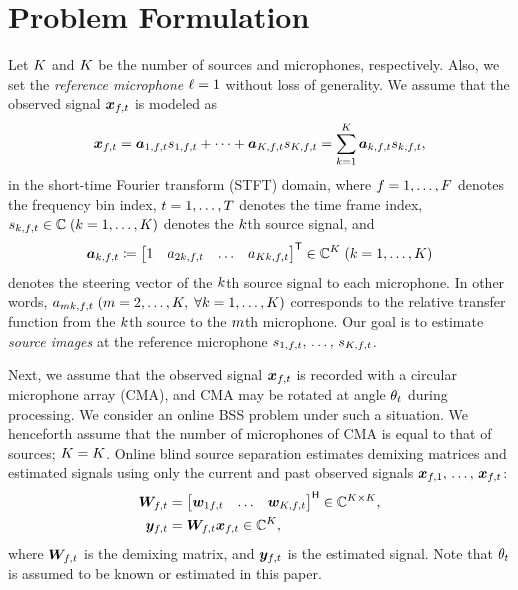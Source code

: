 \documentclass[sip,biber]{now-journal}
\begin{document}
\section{Problem Formulation}\label{sec:problem}
Let $K$ and $\Mic$ be the number of sources and microphones, respectively.
Also, we set the \emph{reference microphone} $\ell = 1$ without loss of generality.
We assume that the observed signal $\Obs _{\ft}$ is modeled as
\begin{equation}
  \Obs _{\ft} = \steer _{1,\ft} \sig _{1,\ft} + \dots + \steer _{\Src,\ft} \sig _{\Src,\ft} = \sum _{\src=1} ^{\Src} \steer _{\src,\ft} \sig _{\src,\ft},\label{eq:mix}
\end{equation}
in the short-time Fourier transform (STFT) domain,
where $f = 1, \dots, F$ denotes the frequency bin index,
$t = 1, \dots, T$ denotes the time frame index,
$\sig _{\src,\ft} \in \C\; (\src = 1, \dots, \Src)$ denotes the $k$th source signal, and
\begin{equation*}
  \steer _{\src,\ft} \coloneqq \begin{bmatrix} 1 & \str _{2\src,\ft} & \dots & \str _{\Mic\src,\ft} \end{bmatrix} ^{\top} \in \C ^{\Mic}\; (\src = 1, \dots, \Src)
\end{equation*}
denotes the steering vector of the $k$th source signal to each microphone.
In other words, $\str _{\mic\src,\ft} \; (\mic = 2, \dots, \Mic,\; \forall \src = 1, \dots, \Src)$ corresponds to the relative transfer function from the $k$th source to the $m$th microphone.
Our goal is to estimate \emph{source images} at the reference microphone $\sig _{1,\ft},\, \dots,\, \sig _{\Src,\ft}$.

Next, we assume that the observed signal $\Obs _{\ft}$ is recorded with a circular microphone array (CMA), and CMA may be rotated at angle $\theta _{t}$ during processing.
We consider an online BSS problem under such a situation.
We henceforth assume that the number of microphones of CMA is equal to that of sources; $\Mic = \Src$.
\renewcommand{\Mic}{\Src}%
Online blind source separation estimates demixing matrices and estimated signals using only the current and past observed signals $\bm{x} _{f,1},\, \dots,\, \bm{x} _{f,t}$:
\begin{align}
  \Demix _{\ft} &= \begin{bmatrix} \demix _{1\ft} & \dots & \demix _{\Src,\ft} \end{bmatrix} ^{\hermite} \in \C ^{\Src \times \Mic}, \\
  \Est _{\ft} &= \Demix _{\ft} \Obs _{\ft} \in \C ^{\Src},
\end{align}
where $\Demix _{\ft}$ is the demixing matrix, and $\Est _{\ft}$ is the estimated signal.
Note that $\theta _{t}$ is assumed to be known or estimated in this paper.
\end{document}

